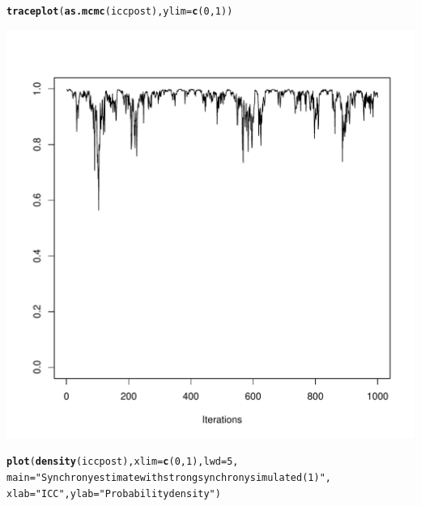 \documentclass[a4paper, 10pt]{scrartcl}\usepackage[]{graphicx}\usepackage[]{color}
\makeatletter
\def\maxwidth{ %
  \ifdim\Gin@nat@width>\linewidth
    \linewidth
  \else
    \Gin@nat@width
  \fi
}
\newcommand{\hlnum}[1]{\textcolor[rgb]{0.686,0.059,0.569}{#1}}%
\newcommand{\hlstr}[1]{\textcolor[rgb]{0.192,0.494,0.8}{#1}}%
\newcommand{\hlstd}[1]{\textcolor[rgb]{0.345,0.345,0.345}{#1}}%
\newcommand{\hlkwc}[1]{\textcolor[rgb]{0.333,0.667,0.333}{#1}}%
\newcommand{\hlkwd}[1]{\textcolor[rgb]{0.737,0.353,0.396}{\textbf{#1}}}%
\newenvironment{kframe}{%
 \def\at@end@of@kframe{}%
 \ifinner\ifhmode%
  \def\at@end@of@kframe{\end{minipage}}%
  \begin{minipage}{\columnwidth}%
 \fi\fi%
 \def\FrameCommand##1{\hskip\@totalleftmargin \hskip-\fboxsep
 \colorbox{shadecolor}{##1}\hskip-\fboxsep
     \hskip-\linewidth \hskip-\@totalleftmargin \hskip\columnwidth}%
 \MakeFramed {\advance\hsize-\width
   \@totalleftmargin\z@ \linewidth\hsize
   \@setminipage}}%
 {\par\unskip\endMakeFramed%
 \at@end@of@kframe}
\newenvironment{knitrout}{}{} %
\makeatother
\begin{document}
\begin{knitrout}
\begin{kframe}
\begin{alltt}
\hlkwd{traceplot}\hlstd{(}\hlkwd{as.mcmc}\hlstd{(iccpost),} \hlkwc{ylim}\hlstd{=}\hlkwd{c}\hlstd{(}\hlnum{0}\hlstd{,}\hlnum{1}\hlstd{))}
\end{alltt}
\end{kframe}
\includegraphics[width=\maxwidth]{figure/unnamed-chunk-11-1} 
\begin{kframe}\begin{alltt}
\hlkwd{plot}\hlstd{(}\hlkwd{density}\hlstd{(iccpost),} \hlkwc{xlim} \hlstd{=} \hlkwd{c}\hlstd{(}\hlnum{0}\hlstd{,}\hlnum{1}\hlstd{),} \hlkwc{lwd}\hlstd{=}\hlnum{5}\hlstd{,}
     \hlkwc{main}\hlstd{=}\hlstr{"Synchrony estimate with strong synchrony simulated (1)"}\hlstd{,}
     \hlkwc{xlab}\hlstd{=}\hlstr{"ICC"}\hlstd{,} \hlkwc{ylab}\hlstd{=}\hlstr{"Probability density"}\hlstd{)}


\end{alltt}
\end{kframe}
\end{knitrout}
\end{document}
